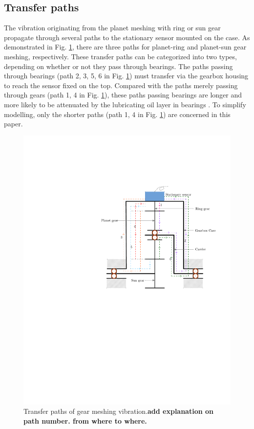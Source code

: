 \documentclass[a4paper,fleqn]{cas-sc}%
\begin{document}
\subsection{Transfer paths\label{sec:transfer_path}}
\par The vibration originating from the planet meshing with ring or sun gear propagate through several paths to the stationary sensor mounted on the case. As demonstrated in Fig. \ref{fig:transfer_path}, there are three paths for planet-ring and planet-sun gear meshing, respectively. These transfer paths can be categorized into two types, depending on whether or not they pass through bearings. The paths passing through bearings (path 2, 3, 5, 6 in Fig. \ref{fig:transfer_path}) must transfer via the gearbox housing to reach the sensor fixed on the top. Compared with the paths merely passing through gears (path 1, 4 in Fig. \ref{fig:transfer_path}), these paths passing bearings are longer and more likely to be attenuated by the lubricating oil layer in bearings \cite{Feng2012}. To simplify modelling, only the shorter paths (path 1, 4 in Fig. \ref{fig:transfer_path}) are concerned in this paper.
\begin{figure}[pos=htbp]
    \centering
    \includegraphics[scale=0.5]{transfer_path.pdf}
    \caption{Transfer paths of gear meshing vibration.\textbf{add explanation on path number. from where to where.}\label{fig:transfer_path}}
\end{figure}
\end{document}
